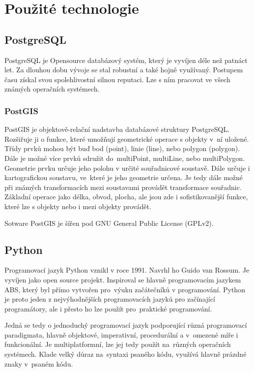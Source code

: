 \chapter{Použité technologie}
\label{3-technologie}

\section{PostgreSQL}
\label{PostgreSQL}
PostgreSQL je Opensource databázový systém, který je vyvíjen déle než patnáct
let. Za dlouhou dobu vývoje se stal robustní a také hojně využívaný.
Postupem času získal svou spolehlivostní silnou reputaci.
Lze s ním pracovat ve všech známých operačních systémech. 
\cite{PostgreSQL}

\subsection{PostGIS}
\label{PostGIS}
PostGIS je objektově-relační nadstavba databázové struktury PostgreSQL.
Rozšiřuje ji o funkce, které umožňují geometrické operace s objekty
v~ní uložené. Třídy prvků mohou být buď bod (point), linie (line),
nebo polygon (polygon). Dále je možné více prvků sdružit
do~multiPoint, multiLine, nebo multiPolygon. Geometrie prvku určuje
jeho polohu v určité souřadnicové soustavě. Dále určuje i
kartografickou soustavu, ve~které je jeho geometrie určena. Je tedy
dále možné při známých transformacích mezi soustavami provádět
transformace souřadnic. Základní operace jako délka, obvod, plocha,
ale jsou zde i sofistikovanější funkce, které lze s objekty nebo
i mezi objekty provádět. 

Sotware PostGIS je šířen pod GNU General Public License (GPLv2).

\section{Python}
\label{Python}
Programovací jazyk Python vznikl v roce 1991. Navrhl ho Guido van
Rossum. Je vyvíjen jako open source projekt. Inspiroval se hlavně
programovacím jazykem ABS, který byl přímo vytvořen pro~výuku 
začátečníků v programování. Python je proto jeden z nejvýhodnějších
programovacích jazyků pro začínající programátory, ale i přesto ho lze
použít pro~praktické programování.

Jedná se tedy o jednoduchý programovací jazyk podporující různá
programovací paradigmata, hlavně objektové, imperativní, procedurální
a v~omezené míře i funkcionální. Je multiplatformní, lze jej tedy
použít na~různých operačních systémech. Klade velký důraz na~syntaxi 
psaného kódu, využívá hlavně prázdné znaky v~psaném kódu.

